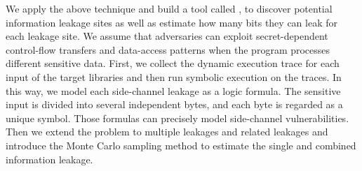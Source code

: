 We apply the above technique and build a tool called \tool{},
to discover potential information leakage sites as well as estimate how
many bits they can leak for each leakage site. We assume that adversaries can
exploit secret-dependent control-flow transfers and data-access patterns when
the program processes different sensitive data.
First, we collect the dynamic execution trace for each input of the target
libraries and then run symbolic execution on the traces. In this way, we model
each side-channel leakage as a logic formula. The sensitive input is divided into
several independent bytes, and each byte is regarded as a unique symbol. Those
formulas can precisely model side-channel vulnerabilities. Then we extend the
problem to multiple leakages and related leakages and introduce the Monte Carlo
sampling method to estimate the single and combined information leakage. 





